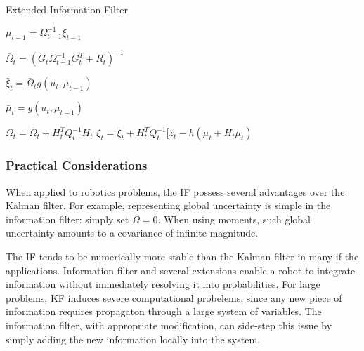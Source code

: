 \documentclass[14pt,letterpaper]{article}
\theoremstyle{definition}
\newcommand{\obs}{\bm{z}}
\newcommand{\control}{\bm{u}}
\begin{document}
\begin{algorithm}[H]
\caption{Extended Information Filter}
\KwInput{$\xi_{t-1}$, $\Omega_{t-1}$, $\control_t$, $\obs_t$}

\BlankLine
{}
$\mu_{t-1} = \Omega_{t-1}^{-1} \xi_{t-1} $\;

\BlankLine


$\bar{\Omega}_t = (G_t \Omega_{t-1}^{-1} G_t^T + R_t)^{-1}$\;

$\bar{\xi}_t = \bar{\Omega}_t g(u_t, \mu_{t-1})$\;

$\bar{\mu}_t = g(u_t, \mu_{t-1})$\;

\BlankLine
{}

$\Omega_t = \bar{\Omega}_t + H_t^T Q_t^{-1} H_t $\;
$\xi_t = \bar{\xi}_t + H_t^T Q_t^{-1} [z_t -h(\bar{\mu}_t + H_t \bar{\mu}_t) $\;

\BlankLine
{}
\end{algorithm}

\vspace{2mm}

\subsubsection{Practical Considerations}

When applied to robotics problems, the IF possess several advantages over the Kalman filter.
For example, representing global uncertainty is simple in the information filter: simply set $\Omega = 0$.
When using moments, such global uncertainty amounts to a covariance of infinite magnitude.

The IF tends to be numerically more stable than the Kalman filter in many if the applications.
Information filter and several extensions enable a robot to integrate information without immediately resolving it into probabilities.
For large problems, KF induces severe computational probelems, since any new piece of information requires propagaton through a large system of variables.
The information filter, with appropriate modification, can side-step this issue by simply adding the new information locally into the system.

\newpage
\end{document}
